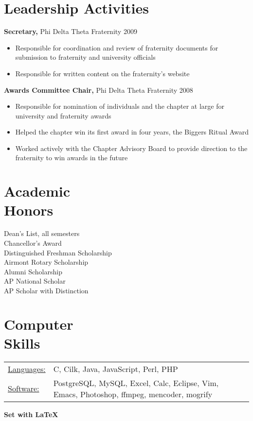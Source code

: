 \documentclass[margin]{res}
\begin{document}
\begin{resume}
\section{Leadership Activities} 
{\bf Secretary,} Phi Delta Theta Fraternity     \hfill 2009
    \begin{itemize} \itemsep -2pt
    \item Responsible for coordination and review of fraternity documents
              for submission to fraternity and university officials
    \item Responsible for written content on the fraternity's website
    \end{itemize}

{\bf Awards Committee Chair,} Phi Delta Theta Fraternity \hfill 2008 
    \begin{itemize} \itemsep -2pt
    \item  Responsible for nomination of individuals and the
                chapter at large for university and fraternity
                awards 
    \item Helped the chapter win its first award in four years,
                the Biggers Ritual Award
    \item Worked actively with the Chapter Advisory Board to provide
                direction to the fraternity to win awards in the future
    \end{itemize}

\section{Academic \\ Honors} 
Dean's List, all semesters \\
Chancellor's Award \\
Distinguished Freshman Scholarship \\
Airmont Rotary Scholarship \\
Alumni Scholarship \\
AP National Scholar \\
AP Scholar with Distinction 

\section{Computer \\ Skills}
\begin{tabular}{l p{3in}}
\underline{Languages:} & C, Cilk, Java, JavaScript, Perl, PHP \\

\underline{Software:} & PostgreSQL, MySQL, Excel, Calc, Eclipse,
                        Vim, Emacs, Photoshop, ffmpeg, mencoder,
                        mogrify
\end{tabular}

\vfill

\begin{center}
\hspace{-4cm} \bf \scriptsize Set with \LaTeX
\end{center}

\end{resume}
\end{document}
